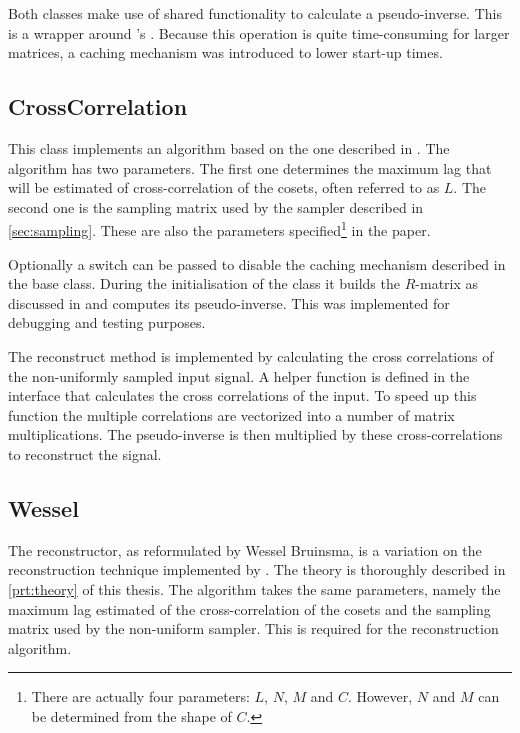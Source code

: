 \documentclass[a4paper, openany, oneside]{memoir}
\begin{document}
Both classes make use of shared functionality to calculate a pseudo-inverse. This is a wrapper around 's . Because this operation is quite time-consuming for larger matrices, a caching mechanism was introduced to lower start-up times.

\subsection{CrossCorrelation}
\label{sub:crosscorrelation}
This class implements an algorithm based on the one described in \cite{ariananda2012compressive}. The algorithm has two parameters. The first one determines the maximum lag that will be estimated of cross-correlation of the cosets, often referred to as $L$. The second one is the sampling matrix used by the sampler described in \cref{sec:sampling}. These are also the parameters specified\footnote{\label{fn:reconparam}There are actually four parameters: $L$, $N$, $M$ and $C$. However, $N$ and $M$ can be determined from the shape of $C$.} in the paper.

Optionally a switch can be passed to disable the caching mechanism described in the base class. During the initialisation of the class it builds the $R$-matrix as discussed in \cite{ariananda2012compressive} and computes its pseudo-inverse. This was implemented for debugging and testing purposes.

The reconstruct method is implemented by calculating the cross correlations of the non-uniformly sampled input signal. A helper function is defined in the \\ interface that calculates the cross correlations of the input. To speed up this function the multiple correlations are vectorized into a number of matrix multiplications. The pseudo-inverse is then multiplied by these cross-correlations to reconstruct the signal.

\subsection{Wessel}
\label{sub:wessel}
The reconstructor, as reformulated by Wessel Bruinsma, is a variation on the reconstruction technique implemented by . The theory is thoroughly described in \cref{prt:theory} of this thesis. The algorithm takes the same parameters, namely the maximum lag estimated of the cross-correlation of the cosets and the sampling matrix used by the non-uniform sampler. This is required for the reconstruction algorithm.
\end{document}
